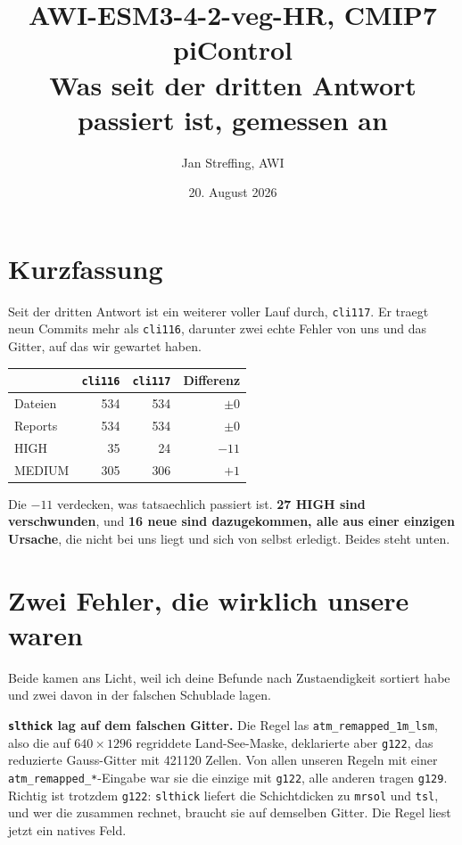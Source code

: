 \documentclass[11pt,a4paper]{article}
\title{AWI-ESM3-4-2-veg-HR, CMIP7 piControl\\[2mm]
\large Was seit der dritten Antwort passiert ist, gemessen an \code{cli117}}
\author{Jan Streffing, AWI}
\date{20. August 2026}
\newcommand{\code}[1]{\texttt{\small #1}}
\begin{document}
\maketitle

\section{Kurzfassung}

Seit der dritten Antwort ist ein weiterer voller Lauf durch, \code{cli117}. Er
traegt neun Commits mehr als \code{cli116}, darunter zwei echte Fehler von uns und
das Gitter, auf das wir gewartet haben.

\begin{center}
\begin{tabular}{lrrr}
\toprule
& \textbf{\code{cli116}} & \textbf{\code{cli117}} & \textbf{Differenz} \\
\midrule
Dateien & 534 & 534 & $\pm 0$ \\
Reports & 534 & 534 & $\pm 0$ \\
HIGH    &  35 &  24 & $-11$ \\
MEDIUM  & 305 & 306 & $+1$ \\
\bottomrule
\end{tabular}
\end{center}

Die $-11$ verdecken, was tatsaechlich passiert ist. \textbf{27 HIGH sind
verschwunden}, und \textbf{16 neue sind dazugekommen, alle aus einer einzigen
Ursache}, die nicht bei uns liegt und sich von selbst erledigt. Beides steht unten.

\section{Zwei Fehler, die wirklich unsere waren}

Beide kamen ans Licht, weil ich deine Befunde nach Zustaendigkeit sortiert habe und
zwei davon in der falschen Schublade lagen.

\textbf{\code{slthick} lag auf dem falschen Gitter.} Die Regel las
\code{atm\_remapped\_1m\_lsm}, also die auf $640 \times 1296$ regriddete
Land-See-Maske, deklarierte aber \code{g122}, das reduzierte Gauss-Gitter mit
421120 Zellen. Von allen unseren Regeln mit einer \code{atm\_remapped\_*}-Eingabe war
sie die einzige mit \code{g122}, alle anderen tragen \code{g129}. Richtig ist
trotzdem \code{g122}: \code{slthick} liefert die Schichtdicken zu \code{mrsol} und
\code{tsl}, und wer die zusammen rechnet, braucht sie auf demselben Gitter. Die
Regel liest jetzt ein natives Feld.
\end{document}
